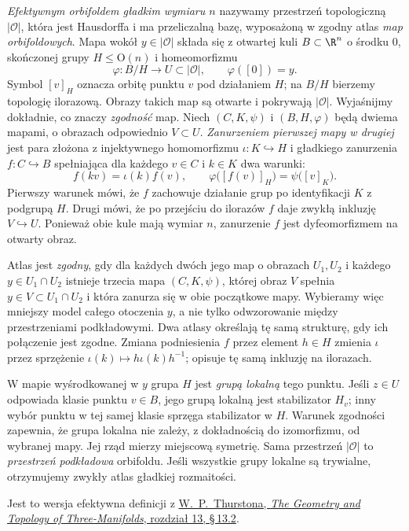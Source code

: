 \begin{definicja}
\label{def:klein-orbifold}
\emph{Efektywnym orbifoldem gładkim wymiaru $n$} nazywamy
przestrzeń topologiczną $|\mathcal O|$, która jest Hausdorffa i ma
przeliczalną bazę, wyposażoną w zgodny atlas \emph{map
orbifoldowych}. Mapa wokół $y\in|\mathcal O|$ składa się z otwartej
kuli $B\subset\R^n$ o środku $0$, skończonej grupy
$H\leq\mathrm O(n)$ i homeomorfizmu
\[
 \varphi:B/H\longrightarrow U\subset|\mathcal O|,
 \qquad \varphi([0])=y.
\]
Symbol $[v]_H$ oznacza orbitę punktu $v$ pod działaniem $H$;
na $B/H$ bierzemy topologię ilorazową.
Obrazy takich map są otwarte i pokrywają $|\mathcal O|$.
Wyjaśnijmy dokładnie, co znaczy \emph{zgodność} map.
Niech $(C,K,\psi)$ i $(B,H,\varphi)$ będą dwiema mapami,
o obrazach odpowiednio $V\subset U$. \emph{Zanurzeniem pierwszej
mapy w drugiej} jest para złożona z injektywnego homomorfizmu
$\iota:K\hookrightarrow H$ i gładkiego zanurzenia
$f:C\hookrightarrow B$ spełniająca dla każdego $v\in C$
i $k\in K$ dwa warunki:
\[
 f(kv)=\iota(k)f(v),
 \qquad
 \varphi\bigl([f(v)]_H\bigr)=\psi\bigl([v]_K\bigr).
\]
Pierwszy warunek mówi, że $f$ zachowuje działanie grup po
identyfikacji $K$ z podgrupą $H$. Drugi mówi, że po przejściu
do ilorazów $f$ daje zwykłą inkluzję $V\hookrightarrow U$.
Ponieważ obie kule mają wymiar $n$, zanurzenie $f$ jest
dyfeomorfizmem na otwarty obraz.

Atlas jest \emph{zgodny}, gdy dla każdych dwóch jego map
o obrazach $U_1,U_2$ i każdego $y\in U_1\cap U_2$
istnieje trzecia mapa $(C,K,\psi)$, której obraz $V$ spełnia
$y\in V\subset U_1\cap U_2$ i która zanurza się w obie
początkowe mapy. Wybieramy więc mniejszy model całego
otoczenia $y$, a nie tylko odwzorowanie między przestrzeniami
podkładowymi. Dwa atlasy określają tę samą strukturę, gdy
ich połączenie jest zgodne. Zmiana podniesienia $f$ przez
element $h\in H$ zmienia $\iota$ przez sprzężenie
$\iota(k)\mapsto h\iota(k)h^{-1}$; opisuje tę samą inkluzję
na ilorazach.

W mapie wyśrodkowanej w $y$ grupa $H$ jest \emph{grupą lokalną}
tego punktu. Jeśli $z\in U$ odpowiada klasie punktu $v\in B$,
jego grupą lokalną jest stabilizator $H_v$; inny wybór punktu
w tej samej klasie sprzęga stabilizator w $H$. Warunek zgodności
zapewnia, że grupa lokalna nie zależy, z dokładnością do
izomorfizmu, od wybranej mapy. Jej rząd mierzy miejscową
symetrię. Sama przestrzeń $|\mathcal O|$ to \emph{przestrzeń
podkładowa} orbifoldu. Jeśli wszystkie grupy lokalne są
trywialne, otrzymujemy zwykły atlas gładkiej rozmaitości.
\end{definicja}
Jest to wersja efektywna definicji z
\href{https://library.slmath.org/nonmsri/gt3m/PDF/13.pdf}
{W.\ P.\ Thurstona, \emph{The Geometry and Topology of
Three-Manifolds}, rozdział 13, \S\,13.2}.

